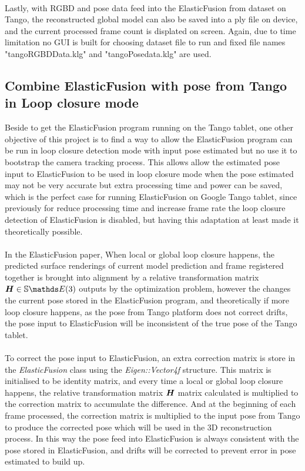 \documentclass[12pt,twoside]{article}
\begin{document}
\\
Lastly, with RGBD and pose data feed into the ElasticFusion from dataset on Tango, the reconstructed global model can also be saved into a ply file on device, and the current processed frame count is displated on screen. Again, due to time limitation no GUI is built for choosing dataset file to run and fixed file names "tangoRGBDData.klg" and "tangoPosedata.klg" are used.\\


\newpage




\subsection{Combine ElasticFusion with pose from Tango in Loop closure mode}
Beside to get the ElasticFusion program running on the Tango tablet, one other objective of this project is to find a way to allow the ElasticFusion program can be run in loop closure detection mode with input pose estimated but no use it to bootstrap the camera tracking process. This allows allow the estimated pose input to ElasticFusion to be used in loop closure mode when the pose estimated may not be very accurate but extra processing time and power can be saved, which is the perfect case for running ElasticFusion on Google Tango tablet, since previously for reduce processing time and increase frame rate the loop closure detection of ElasticFusion is disabled, but having this adaptation at least made it theoretically possible. \\
\\
In the ElasticFusion\citep{whelan2016elasticfusion} paper, When local or global loop closure happens, the predicted surface renderings of current model prediction and frame registered together is brought into alignment by a relative transformation matrix $\mat H \in \mathbb{S}\E(3)$ outputs by the optimization problem, however the changes the current pose stored in the ElasticFusion program, and theoretically if more loop closure happens, as the pose from Tango platform does not correct drifts, the pose input to ElasticFusion will be inconsistent of the true pose of the Tango tablet.\\
\\
To correct the pose input to ElasticFusion, an extra correction matrix is store in the \textit{ElasticFusion} class using the \textit{Eigen::Vector4f} structure. This matrix is initialised to be identity matrix, and every time a local or global loop closure happens, the relative transformation matrix ${\boldsymbol{{H}}}$ matrix calculated is multiplied to the correction matrix to accumulate the difference. And at the beginning of each frame processed, the correction matrix is multiplied to the input pose from Tango to produce the corrected pose which will be used in the 3D reconstruction process. In this way the pose feed into ElasticFusion is always consistent with the pose stored in ElasticFusion, and drifts will be corrected to prevent error in pose estimated to build up.\\
\end{document}
